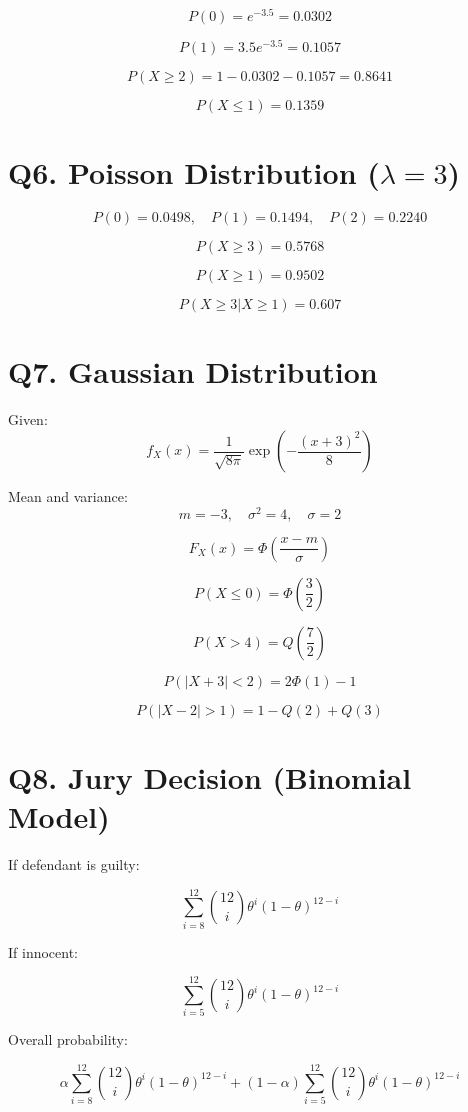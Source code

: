 \documentclass[12pt]{article}
\begin{document}
\[
P(0)=e^{-3.5}=0.0302
\]

\[
P(1)=3.5e^{-3.5}=0.1057
\]

\[
P(X\ge 2)=1-0.0302-0.1057=0.8641
\]

\[
P(X\le 1)=0.1359
\]

\section*{Q6. Poisson Distribution ($\lambda=3$)}

\[
P(0)=0.0498,\quad
P(1)=0.1494,\quad
P(2)=0.2240
\]

\[
P(X\ge 3)=0.5768
\]

\[
P(X\ge 1)=0.9502
\]

\[
P(X\ge 3|X\ge 1)=0.607
\]

\section*{Q7. Gaussian Distribution}

Given:
\[
f_X(x)=\frac{1}{\sqrt{8\pi}}\exp\left(-\frac{(x+3)^2}{8}\right)
\]

Mean and variance:
\[
m=-3,\quad \sigma^2=4,\quad \sigma=2
\]

\[
F_X(x)=\Phi\left(\frac{x-m}{\sigma}\right)
\]

\[
P(X\le 0)=\Phi\left(\frac{3}{2}\right)
\]

\[
P(X>4)=Q\left(\frac{7}{2}\right)
\]

\[
P(|X+3|<2)=2\Phi(1)-1
\]

\[
P(|X-2|>1)=1-Q(2)+Q(3)
\]

\section*{Q8. Jury Decision (Binomial Model)}

If defendant is guilty:

\[
\sum_{i=8}^{12} \binom{12}{i}\theta^i(1-\theta)^{12-i}
\]

If innocent:

\[
\sum_{i=5}^{12} \binom{12}{i}\theta^i(1-\theta)^{12-i}
\]

Overall probability:

\[
\alpha\sum_{i=8}^{12}\binom{12}{i}\theta^i(1-\theta)^{12-i}
+(1-\alpha)\sum_{i=5}^{12}\binom{12}{i}\theta^i(1-\theta)^{12-i}
\]
\end{document}
